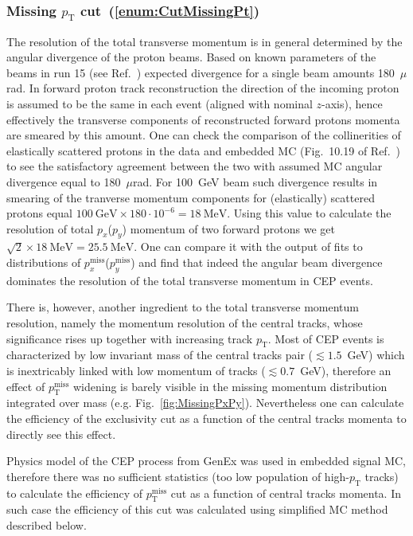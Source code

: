 \subsubsection{Missing \texorpdfstring{$p_{\text{T}}$}{pT} cut~(\ref{enum:CutMissingPt})}

The resolution of the total transverse momentum is in general determined by the angular divergence of the proton beams. Based on known parameters of the beams in run 15 (see Ref.~\cite{run15Overview}) expected divergence for a single beam amounts 180~$\mu$rad. In forward proton track reconstruction the direction of the incoming proton is assumed to be the same in each event (aligned with nominal $z$-axis), hence effectively the transverse components of reconstructed forward protons momenta are smeared by this amount. One can check the comparison of the collinerities of elastically scattered protons in the data and embedded MC (Fig.~10.19 of Ref.~\cite{supplementaryNote}) to see the satisfactory agreement between the two with assumed MC angular divergence equal to 180~$\mu$rad. For 100~GeV beam such divergence results in smearing of the tranverse momentum components for (elastically) scattered protons equal $100~\text{GeV}\times 180\cdot 10^{-6} = 18~\text{MeV}$. Using this value to calculate the resolution of total $p_{x}$($p_{y}$) momentum of two forward protons we get $\sqrt{2}\times 18~\text{MeV} = 25.5~\text{MeV}$. One can compare it with the output of fits to distributions of  $p_{x}^{\text{miss}}$($p_{y}^{\text{miss}}$) and find that indeed the angular beam divergence dominates the resolution of the total transverse momentum in CEP events. 

There is, however, another ingredient to the total transverse momentum resolution, namely the momentum resolution of the central tracks, whose significance rises up together with increasing track $p_{\text{T}}$. Most of CEP events is characterized by low invariant mass of the central tracks pair ($\lesssim 1.5$~GeV) which is inextricably linked with low momentum of tracks ($\lesssim 0.7$~GeV), therefore an effect of $p_{\text{T}}^{\text{miss}}$ widening is barely visible in the missing momentum distribution integrated over mass (e.g. Fig.~\ref{fig:MissingPxPy}). Nevertheless one can calculate the efficiency of the exclusivity cut as a function of the central tracks momenta to directly see this effect.

Physics model of the CEP process from GenEx was used in embedded signal MC, therefore there was no sufficient statistics (too low population of high-$p_{\text{T}}$ tracks) to calculate the efficiency of $p_{\text{T}}^{\text{miss}}$ cut as a function of central tracks momenta. In such case the efficiency of this cut was calculated using simplified MC method described below.


